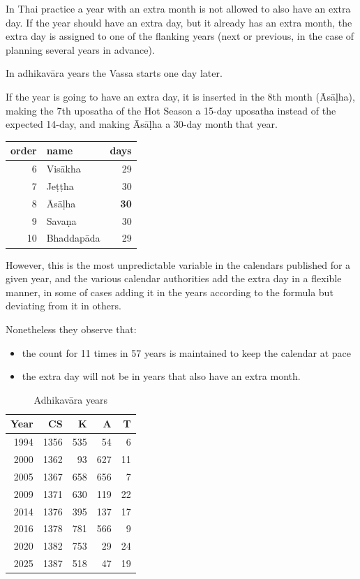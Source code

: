 \documentclass[11pt,oneside]{memoir-article}
\begin{document}
In Thai practice a year with an extra month is not allowed to also
have an extra day. If the year should have an extra day, but it
already has an extra month, the extra day is assigned to one of the
flanking years (next or previous, in the case of planning several
years in advance).

In adhikavāra years the Vassa starts one day later.

If the year is going to have an extra day, it is inserted in the 8th month
(Āsāḷha), making the 7th uposatha of the Hot Season a 15-day uposatha instead of
the expected 14-day, and making Āsāḷha a 30-day month that
year.\cite{hasapannyo-zodiac}

\begin{center}
\begin{tabular}{rlr}
order & name & days\\
\hline
6 & Visākha & 29\\
7 & Jeṭṭha & 30\\
8 & Āsāḷha & \textbf{30}\\
9 & Savaṇa & 30\\
10 & Bhaddapāda & 29\\
\end{tabular}
\end{center}

However, this is the most unpredictable variable in the calendars published for
a given year, and the various calendar authorities add the extra day in a
flexible manner, in some of cases adding it in the years according to the
formula but deviating from it in others.


Nonetheless they observe that:

\begin{itemize}
\item the count for 11 times in 57 years is maintained to keep the
calendar at pace
\item the extra day will not be in years that also have an extra month.
\end{itemize}

\begin{table}[h]
\caption{\label{tbl-cycle-adhikavara} Adhikavāra years}
\centering
\begin{tabular}{rrrrr}
Year & CS & K & A & T\\
\hline
1994 & 1356 & 535 & 54 & 6\\
2000 & 1362 & 93 & 627 & 11\\
2005 & 1367 & 658 & 656 & 7\\
2009 & 1371 & 630 & 119 & 22\\
2014 & 1376 & 395 & 137 & 17\\
2016 & 1378 & 781 & 566 & 9\\
2020 & 1382 & 753 & 29 & 24\\
2025 & 1387 & 518 & 47 & 19\\
\end{tabular}
\end{table}
\end{document}
